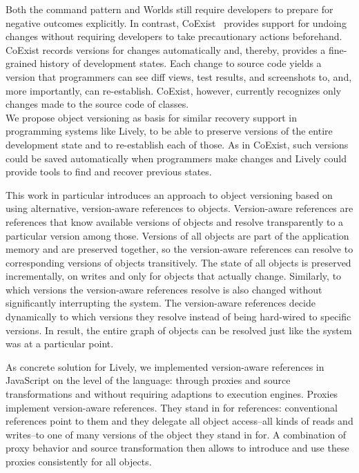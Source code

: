 Both the command pattern and Worlds still require developers to prepare for negative outcomes explicitly.
In contrast, CoExist~\cite{Steinert2012COE} provides support for undoing changes without requiring developers to take precautionary actions beforehand.
CoExist records versions for changes automatically and, thereby, provides a fine-grained history of development states.
Each change to source code yields a version that programmers can see diff views, test results, and screenshots to, and, more importantly, can re-establish.
CoExist, however, currently recognizes only changes made to the source code of classes. \\

We propose object versioning as basis for similar recovery support in programming systems like Lively, to be able to preserve versions of the entire development state and to re-establish each of those.
As in CoExist, such versions could be saved automatically when programmers make changes and Lively could provide tools to find and recover previous states.

This work in particular introduces an approach to object versioning based on using alternative, version-aware references to objects.
Version-aware references are references that know available versions of objects and resolve transparently to a particular version among those.
Versions of all objects are part of the application memory and are preserved together, so the version-aware references can resolve to corresponding versions of objects transitively.
The state of all objects is preserved incrementally, on writes and only for objects that actually change.
Similarly, to which versions the version-aware references resolve is also changed without significantly interrupting the system.
The version-aware references decide dynamically to which versions they resolve instead of being hard-wired to specific versions.
In result, the entire graph of objects can be resolved just like the system was at a particular point.

As concrete solution for Lively, we implemented version-aware references in JavaScript on the level of the language: through proxies and source transformations and without requiring adaptions to execution engines.
Proxies implement version-aware references.
They stand in for references: conventional references point to them and they delegate all object access--all kinds of reads and writes--to one of many versions of the object they stand in for.
A combination of proxy behavior and source transformation then allows to introduce and use these proxies consistently for all objects.

